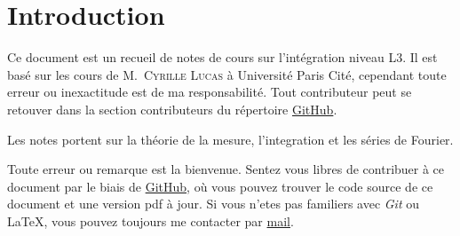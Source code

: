 \section{Introduction}

Ce document est un recueil de notes de cours sur l'intégration niveau L3. Il est
basé sur les cours de M.~\textsc{Cyrille Lucas} à Université Paris Cité, cependant toute
erreur ou inexactitude est de ma responsabilité. Tout contributeur
peut se retouver dans la section contributeurs du répertoire
\href{https://github.com/Yag000/integration-notes/graphs/contributors}{GitHub}.
\vspace{0.5cm}

Les notes portent sur la théorie de la mesure, l'integration et les séries de Fourier.
\vspace{0.5cm}

Toute erreur ou remarque est la bienvenue.
Sentez vous libres de contribuer à ce document par le biais de \href{https://github.com/Yag000/integration-notes}{GitHub},
où vous pouvez trouver le code source de ce document et une version pdf à jour.
Si vous n'etes pas familiers avec \textit{Git} ou \LaTeX , vous pouvez toujours me contacter
par \href{mailto: yago.iglesias.vazquez@gmail.com}{mail}.








